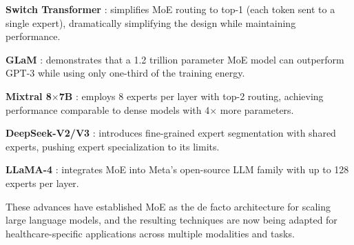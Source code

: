 \textbf{Switch Transformer} \cite{fedus2022switch}: simplifies MoE routing to top-1 (each token sent to a single expert), dramatically simplifying the design while maintaining performance.

\textbf{GLaM} \cite{du2022glam}: demonstrates that a 1.2 trillion parameter MoE model can outperform GPT-3 \cite{brown2020gpt3} while using only one-third of the training energy.

\textbf{Mixtral 8$\times$7B} \cite{jiang2024mixtral}: employs 8 experts per layer with top-2 routing, achieving performance comparable to dense models with 4$\times$ more parameters.

\textbf{DeepSeek-V2/V3} \cite{deepseek2024, zhang2024deepseek_v3}: introduces fine-grained expert segmentation with shared experts, pushing expert specialization to its limits.

\textbf{LLaMA-4} \cite{llama4_2025}: integrates MoE into Meta's open-source LLM family with up to 128 experts per layer.

These advances have established MoE as the de facto architecture for scaling large language models, and the resulting techniques are now being adapted for healthcare-specific applications across multiple modalities and tasks.
